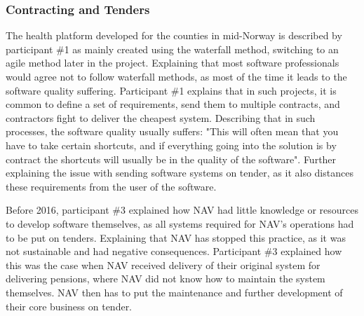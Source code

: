 
\subsubsection{Contracting and Tenders} \label{sec:contracting_and_tenders}
The health platform developed for the counties in mid-Norway is described by participant \#1 as mainly created using the waterfall method, switching to an agile method later in the project. Explaining that most software professionals would agree not to follow waterfall methods, as most of the time it leads to the software quality suffering. Participant \#1 explains that in such projects, it is common to define a set of requirements, send them to multiple contracts, and contractors fight to deliver the cheapest system. Describing that in such processes, the software quality usually suffers: "This will often mean that you have to take certain shortcuts, and if everything going into the solution is by contract the shortcuts will usually be in the quality of the software". Further explaining the issue with sending software systems on tender, as it also distances these requirements from the user of the software.


Before 2016, participant \#3 explained how NAV had little knowledge or resources to develop software themselves, as all systems required for NAV's operations had to be put on tenders. Explaining that NAV has stopped this practice, as it was not sustainable and had negative consequences. Participant \#3 explained how this was the case when NAV received delivery of their original system for delivering pensions, where NAV did not know how to maintain the system themselves. NAV then has to put the maintenance and further development of their core business on tender.

